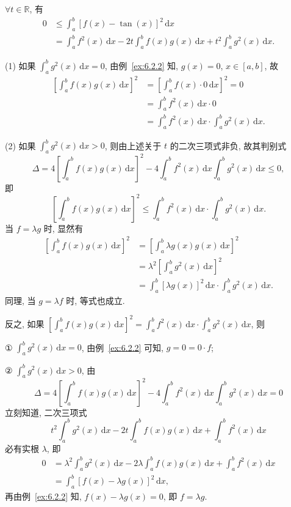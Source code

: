 \begin{solution}[证法 1]
$\forall t\in\mathbb{R}$, 有
\begin{align*}
0&\leqslant\int_{a}^{b}[f(x)-\tan(x)]^{2}\,\mathrm{d}x\\
&=\int_{a}^{b}f^{2}(x)\,\mathrm{d}x-2t\int_{a}^{b}f(x)g(x)\,\mathrm{d}x+t^{2}\int_{a}^{b}g^{2}(x)\,\mathrm{d}x.
\end{align*}

(1) 如果 $\int_{a}^{b}g^{2}(x)\,\mathrm{d}x=0$, 由例~\ref{ex:6.2.2} 知, $g(x)=0$, $x\in[a,b]$, 故
\begin{align*}
\left[\int_{a}^{b}f(x)g(x)\,\mathrm{d}x\right]^{2}&=\left[\int_{a}^{b}f(x)\cdot 0\,\mathrm{d}x\right]^{2}=0\\
&=\int_{a}^{b}f^{2}(x)\,\mathrm{d}x\cdot 0\\
&=\int_{a}^{b}f^{2}(x)\,\mathrm{d}x\cdot\int_{a}^{b}g^{2}(x)\,\mathrm{d}x.
\end{align*}

(2) 如果 $\int_{a}^{b}g^{2}(x)\,\mathrm{d}x>0$, 则由上述关于 $t$ 的二次三项式非负, 故其判别式
\[
\Delta=4\left[\int_{a}^{b}f(x)g(x)\,\mathrm{d}x\right]^{2}-4\int_{a}^{b}f^{2}(x)\,\mathrm{d}x\int_{a}^{b}g^{2}(x)\,\mathrm{d}x\leqslant 0,
\]
即
\[
\left[\int_{a}^{b}f(x)g(x)\,\mathrm{d}x\right]^{2}\leqslant\int_{a}^{b}f^{2}(x)\,\mathrm{d}x\cdot\int_{a}^{b}g^{2}(x)\,\mathrm{d}x.
\]
当 $f=\lambda g$ 时, 显然有
\begin{align*}
\left[\int_{a}^{b}f(x)g(x)\,\mathrm{d}x\right]^{2}&=\left[\int_{a}^{b}\lambda g(x)g(x)\,\mathrm{d}x\right]^{2}\\
&=\lambda^{2}\left[\int_{a}^{b}g^{2}(x)\,\mathrm{d}x\right]^{2}\\
&=\int_{a}^{b}[\lambda g(x)]^{2}\,\mathrm{d}x\cdot\int_{a}^{b}g^{2}(x)\,\mathrm{d}x.
\end{align*}
同理, 当 $g=\lambda f$ 时, 等式也成立.

反之, 如果 $\left[\int_{a}^{b}f(x)g(x)\,\mathrm{d}x\right]^{2}=\int_{a}^{b}f^{2}(x)\,\mathrm{d}x\cdot\int_{a}^{b}g^{2}(x)\,\mathrm{d}x$, 则

① $\int_{a}^{b}g^{2}(x)\,\mathrm{d}x=0$, 由例~\ref{ex:6.2.2} 可知, $g=0=0\cdot f$;

② $\int_{a}^{b}g^{2}(x)\,\mathrm{d}x>0$, 由
\[
\Delta=4\left[\int_{a}^{b}f(x)g(x)\,\mathrm{d}x\right]^{2}-4\int_{a}^{b}f^{2}(x)\,\mathrm{d}x\int_{a}^{b}g^{2}(x)\,\mathrm{d}x=0
\]
立刻知道, 二次三项式
\[
t^{2}\int_{a}^{b}g^{2}(x)\,\mathrm{d}x-2t\int_{a}^{b}f(x)g(x)\,\mathrm{d}x+\int_{a}^{b}f^{2}(x)\,\mathrm{d}x
\]
必有实根 $\lambda$, 即
\begin{align*}
0&=\lambda^{2}\int_{a}^{b}g^{2}(x)\,\mathrm{d}x-2\lambda\int_{a}^{b}f(x)g(x)\,\mathrm{d}x+\int_{a}^{b}f^{2}(x)\,\mathrm{d}x\\
&=\int_{a}^{b}[f(x)-\lambda g(x)]^{2}\,\mathrm{d}x,
\end{align*}
再由例~\ref{ex:6.2.2} 知, $f(x)-\lambda g(x)=0$, 即 $f=\lambda g$.
\end{solution}

